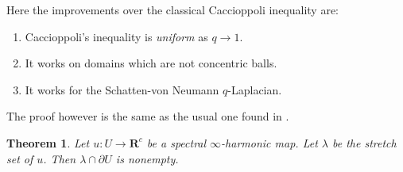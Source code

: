 \documentclass[reqno,11pt]{amsart}
\newcommand{\RR}{\mathbf{R}}
\newtheorem{theorem}{Theorem}[section]
\theoremstyle{definition}
\numberwithin{equation}{section}
\begin{document}
Here the improvements over the classical Caccioppoli inequality are:
\begin{enumerate}
\item Caccioppoli's inequality is \emph{uniform} as $q \to 1$.
\item It works on domains which are not concentric balls.
\item It works for the Schatten-von Neumann $q$-Laplacian.
\end{enumerate}
The proof however is the same as the usual one found in \cite[Chapter 11]{kinnunen2021maximal}.

\begin{theorem}
Let $u: U \to \RR^c$ be a spectral $\infty$-harmonic map.
Let $\lambda$ be the stretch set of $u$.
Then $\lambda \cap \partial U$ is nonempty.
\end{theorem}
\end{document}
